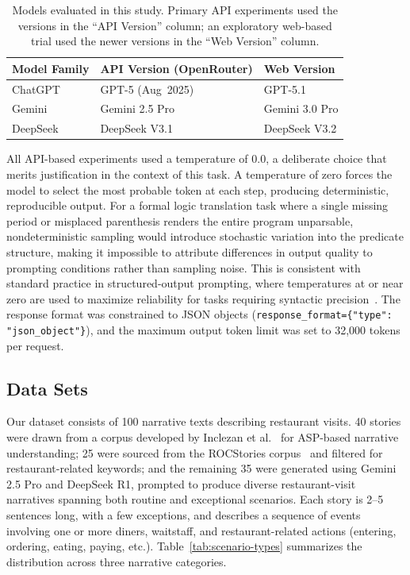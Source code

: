 \documentclass[runningheads]{llncs}
\begin{document}
\begin{table}[t]
\centering
\caption{Models evaluated in this study.  Primary API experiments used the
versions in the ``API Version'' column; an exploratory web-based trial used the
newer versions in the ``Web Version'' column.}
\label{tab:models}
\begin{tabular}{@{}lll@{}}
\toprule
\textbf{Model Family} & \textbf{API Version (OpenRouter)} & \textbf{Web Version} \\
\midrule
ChatGPT & GPT-5 (Aug~2025)~\cite{openai2025gpt5}
        & GPT-5.1~\cite{openai2025gpt51} \\
Gemini  & Gemini 2.5 Pro~\cite{learnlmteam2025evaluatinggeminiarenalearning}
        & Gemini 3.0 Pro \\
DeepSeek& DeepSeek V3.1~\cite{deepseek2025v31}
        & DeepSeek V3.2 \\
\bottomrule
\end{tabular}
\end{table}

All API-based experiments used a temperature of 0.0, a deliberate
choice that merits justification in the context of this task.  A temperature of
zero forces the model to select the most probable token at each step, producing
deterministic, reproducible output.  For a formal logic translation
task where a single missing period or misplaced parenthesis renders the
entire program unparsable, nondeterministic sampling would introduce
stochastic variation into the predicate structure, making it impossible to
attribute differences in output quality to prompting conditions rather than
sampling noise.  This is consistent with standard practice in
structured-output prompting, where temperatures at or near zero are used to
maximize reliability for tasks requiring syntactic precision~\cite{Drozdov2022CompositionalSP,Yang2023CouplingLL}.
The response format was constrained to JSON objects
(\texttt{response\_format=\{"type": "json\_object"\}}), and the maximum output
token limit was set to 32{,}000 tokens per request.

\subsection{Data Sets}
\label{sec:datasets}

Our dataset consists of 100 narrative texts describing restaurant visits.
40 stories were drawn from a corpus developed by
Inclezan et al.~\cite{ZHANG_2019,inclezan2019restkb} for ASP-based narrative
understanding; 25 were sourced from the ROCStories
corpus~\cite{mostafazadeh-etal-2016-corpus} and filtered for
restaurant-related keywords; and the remaining 35 were generated using
Gemini 2.5 Pro and DeepSeek R1, prompted to produce diverse restaurant-visit
narratives spanning both routine and exceptional scenarios.  Each story is
2--5 sentences long, with a few exceptions, 
and describes a sequence of events involving one or more diners, waitstaff,
and restaurant-related actions (entering, ordering, eating, paying, etc.).
Table~\ref{tab:scenario-types} summarizes the distribution across three
narrative categories.
\end{document}
